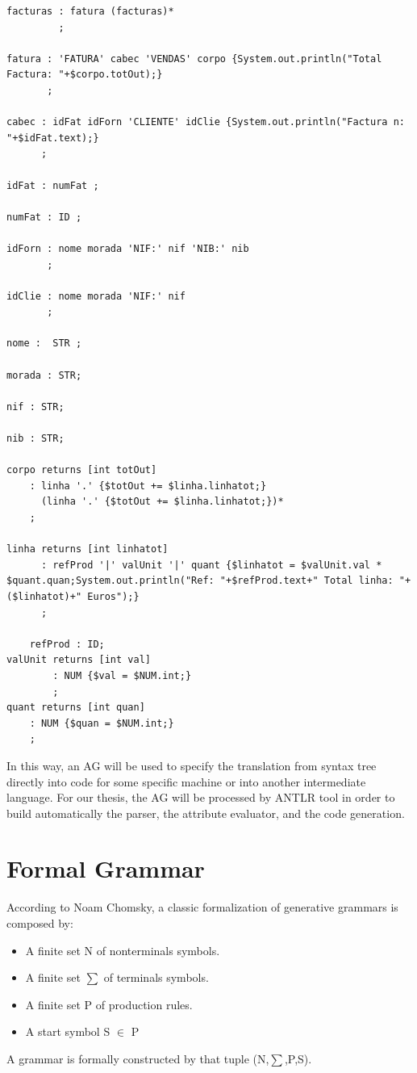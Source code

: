 \documentclass[
  oneside,
  11pt, a4paper,
  footinclude=true,
  headinclude=true,
  cleardoublepage=empty
]{scrbook}
\begin{document}
\begin{lstlisting}[caption={Example of an AG},label={lst:ag}]
facturas : fatura (facturas)*
         ;

fatura : 'FATURA' cabec 'VENDAS' corpo {System.out.println("Total Factura: "+$corpo.totOut);}
       ;

cabec : idFat idForn 'CLIENTE' idClie {System.out.println("Factura n: "+$idFat.text);}
      ;

idFat : numFat ;

numFat : ID ;

idForn : nome morada 'NIF:' nif 'NIB:' nib
       ;

idClie : nome morada 'NIF:' nif
       ;

nome :  STR ;

morada : STR;

nif : STR;

nib : STR;

corpo returns [int totOut]
    : linha '.' {$totOut += $linha.linhatot;}
      (linha '.' {$totOut += $linha.linhatot;})*
    ;

linha returns [int linhatot]
      : refProd '|' valUnit '|' quant {$linhatot = $valUnit.val * $quant.quan;System.out.println("Ref: "+$refProd.text+" Total linha: "+($linhatot)+" Euros");}
      ;
	
	refProd : ID;
valUnit returns [int val]
        : NUM {$val = $NUM.int;}
        ;
quant returns [int quan]
    : NUM {$quan = $NUM.int;}
    ;

\end{lstlisting}


In this way, an AG will be used to specify the translation from syntax tree directly into code for some specific machine or into another intermediate language.
For our thesis, the AG will be processed by ANTLR tool in order to build automatically the parser, the attribute evaluator, and the code generation.

\section{Formal Grammar}
According to Noam Chomsky, a classic formalization of generative grammars is composed by:
\begin{itemize}
        \item A finite set N of nonterminals symbols.
        \item A finite set $\sum$  of terminals symbols.
        \item A finite set P of production rules.
        \item A start symbol S $\in$  P
\end{itemize}
A grammar is formally constructed by that tuple (N,$\sum$,P,S).
\end{document}
